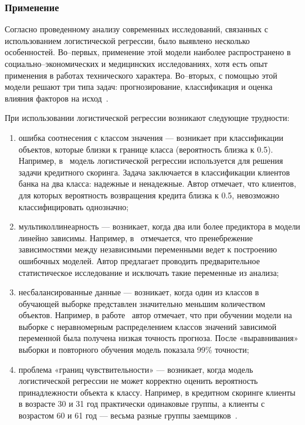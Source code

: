 \subsubsection*{Применение}

Согласно проведенному анализу современных исследований, связанных с использованием логистической регрессии, было выявлено несколько особенностей.
Во--первых, применение этой модели наиболее распространено в социально--экономических и медицинских исследованиях, хотя есть опыт применения в работах технического характера.
Во--вторых, с помощью этой модели решают три типа задач: прогнозирование, классификация и оценка влияния факторов на исход~\cite{vlasenko}.

При использовании логистической регрессии возникают следующие трудности:
\begin{enumerate}[label=\arabic*), leftmargin=1.6\parindent]
    \item ошибка соотнесения с классом значения --- возникает при классификации объектов, которые близки к границе класса (вероятность близка к 0.5).
    Например, в~\cite{simov} модель логистической регрессии используется для решения задачи кредитного скоринга.
    Задача заключается в классификации клиентов банка на два класса: надежные и ненадежные.
    Автор отмечает, что клиентов, для которых вероятность возвращения кредита близка к 0.5, невозможно классифицировать однозначно;
    \item мультиколлинеарность --- возникает, когда два или более предиктора в модели линейно зависимы.
    Например, в~\cite{muradov} отмечается, что пренебрежение зависимостями между независимыми переменными ведет к построению ошибочных моделей.
    Автор предлагает проводить предварительное статистическое исследование и исключать такие переменные из анализа;
    \item несбалансированные данные --- возникает, когда один из классов в обучающей выборке представлен значительно меньшим количеством объектов.
    Например, в работе~\cite{seredniy} автор отмечает, что при обучении модели на выборке с неравномерным распределением классов значений зависимой переменной была получена низкая точность прогноза.
    После «выравнивания» выборки и повторного обучения модель показала 99\% точности;
    \item проблема «границ чувствительности» --- возникает, когда модель логистической регрессии не может корректно оценить вероятность принадлежности объекта к классу.
    Например, в кредитном скоринге клиенты в возрасте 30 и 31 год практически одинаковые группы, а клиенты с возрастом 60 и 61 год --- весьма разные группы заемщиков~\cite{saponov}.
\end{enumerate}

